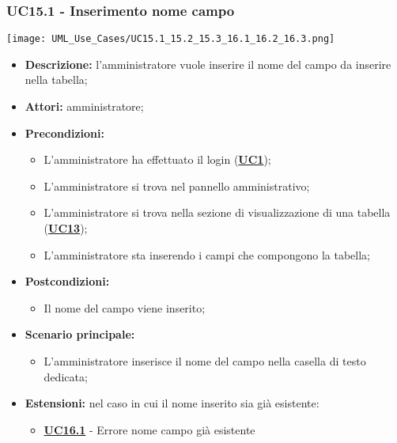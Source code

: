 \subsubsection{UC15.1 - Inserimento nome campo}
\label{sec:UC15.1}
\texttt{[image: UML\_Use\_Cases/UC15.1\_15.2\_15.3\_16.1\_16.2\_16.3.png]}
\begin{itemize}
	\item \textbf{Descrizione:} l’amministratore vuole inserire il nome del campo da inserire nella tabella;
	\item \textbf{Attori:} amministratore;
	\item \textbf{Precondizioni:} 
	\begin{itemize}
		\item L’amministratore ha effettuato il login (\hyperref[sec:UC1]{\textbf{UC1}});
		\item L’amministratore si trova nel pannello amministrativo;
		\item L’amministratore si trova nella sezione di visualizzazione di una tabella (\hyperref[sec:UC13]{\textbf{UC13}});
		\item L’amministratore sta inserendo i campi che compongono la tabella;
	\end{itemize}
	\item \textbf{Postcondizioni:} 
	\begin{itemize}
		\item Il nome del campo viene inserito;
	\end{itemize}
	\item \textbf{Scenario principale:} 
	\begin{itemize}
		\item L’amministratore inserisce il nome del campo nella casella di testo dedicata;
	\end{itemize}
	\item \textbf{Estensioni:} nel caso in cui il nome inserito sia già esistente:
	\begin{itemize}
		\item \hyperref[sec:UC16.1]{\textbf{UC16.1}} - Errore nome campo già esistente
	\end{itemize}
\end{itemize}

